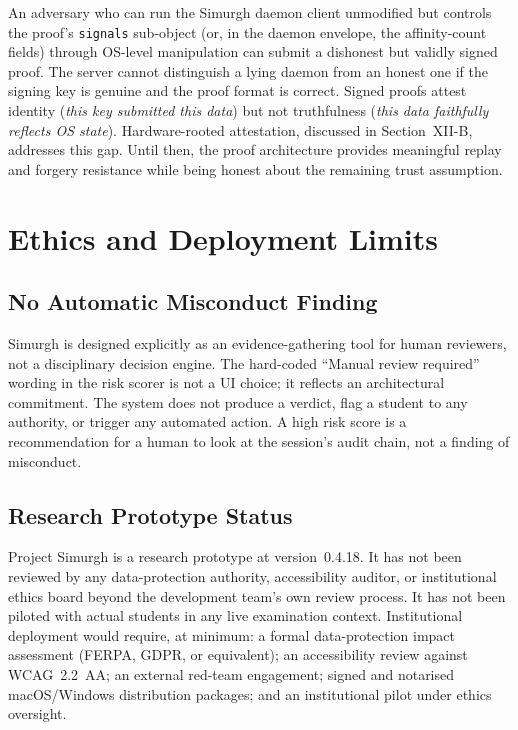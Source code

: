 \documentclass[conference]{IEEEtran}
\begin{document}
An adversary who can run the Simurgh daemon client unmodified but controls the proof's \texttt{signals} sub-object (or, in the daemon envelope, the affinity-count fields) through OS-level manipulation can submit a dishonest but validly signed proof. The server cannot distinguish a lying daemon from an honest one if the signing key is genuine and the proof format is correct. Signed proofs attest identity (\textit{this key submitted this data}) but not truthfulness (\textit{this data faithfully reflects OS state}). Hardware-rooted attestation, discussed in Section~XII-B, addresses this gap. Until then, the proof architecture provides meaningful replay and forgery resistance while being honest about the remaining trust assumption.

\section{Ethics and Deployment Limits}

\subsection{No Automatic Misconduct Finding}

Simurgh is designed explicitly as an evidence-gathering tool for human reviewers, not a disciplinary decision engine. The hard-coded ``Manual review required'' wording in the risk scorer is not a UI choice; it reflects an architectural commitment. The system does not produce a verdict, flag a student to any authority, or trigger any automated action. A high risk score is a recommendation for a human to look at the session's audit chain, not a finding of misconduct.

\subsection{Research Prototype Status}

Project Simurgh is a research prototype at version~0.4.18. It has not been reviewed by any data-protection authority, accessibility auditor, or institutional ethics board beyond the development team's own review process. It has not been piloted with actual students in any live examination context. Institutional deployment would require, at minimum: a formal data-protection impact assessment (FERPA, GDPR, or equivalent); an accessibility review against WCAG~2.2~AA; an external red-team engagement; signed and notarised macOS/Windows distribution packages; and an institutional pilot under ethics oversight.
\end{document}

